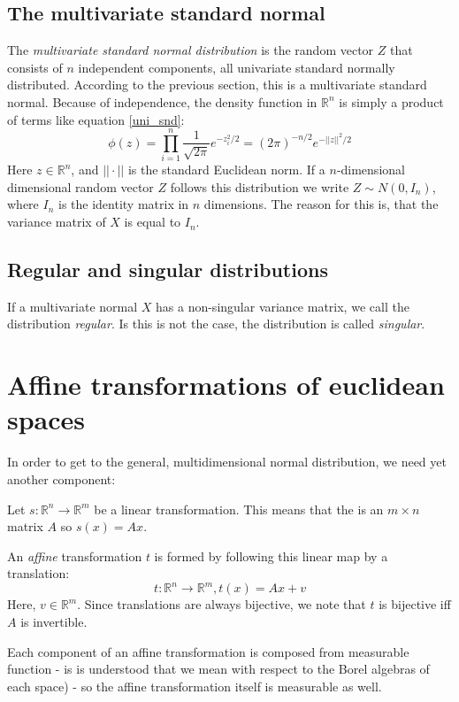 \documentclass[12pt, a4paper]{article}
\numberwithin{equation}{section}
\begin{document}
\subsection{The multivariate standard normal}
The \textit{multivariate standard normal distribution} is the random vector $Z$ that consists of $n$ independent components, all univariate standard normally distributed. According to the previous section, this is a multivariate standard normal. Because of independence, the density function in $\mathbb{R}^n$ is simply a product of terms like equation \ref{uni_snd}:
\begin{equation}
\phi(z)=\prod_{i=1}^n\frac{1}{\sqrt{2\pi}}e^{-z_i^2/2}=(2\pi)^{-n/2}e^{-||z||^2/2}
\end{equation}
Here $z\in\mathbb{R}^n$, and $||\cdot ||$ is the standard Euclidean norm. If a $n$-dimensional dimensional random vector $Z$ follows this distribution we write $Z\sim N(0,I_n)$, where $I_n$ is the identity matrix in $n$ dimensions. The reason for this is, that the variance matrix of $X$ is equal to $I_n$.

\subsection{Regular and singular distributions}
If a multivariate normal $X$ has a non-singular variance matrix, we call the distribution \textit{regular}. Is this is not the case, the distribution is called \textit{singular}.

\section{Affine transformations of euclidean spaces}
In order to get to the general, multidimensional normal distribution, we need yet another component:

Let $s:\mathbb{R}^n\rightarrow\mathbb{R}^m$ be a linear transformation. This means that the is an $m\times n$ matrix $A$ so $s(x)=Ax$.

An \textit{affine} transformation $t$ is formed by following this linear map by a translation:
\begin{equation}
t:\mathbb{R}^n\rightarrow\mathbb{R}^m, t(x)=Ax+v
\end{equation}
Here, $v\in\mathbb{R}^m$. Since translations are always bijective, we note that $t$ is bijective iff $A$ is invertible.

Each component of an affine transformation is composed from measurable function - is is understood that we mean with respect to the Borel algebras of each space) - so the affine transformation itself is measurable as well.
\end{document}
